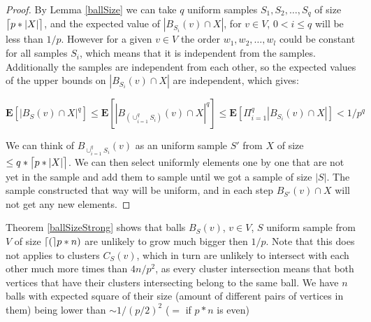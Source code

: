 \documentclass[shortabstract, lic, english]{iithesis}
\theoremstyle{definition} \newtheorem{definition}{Definition}[chapter]
\theoremstyle{remark} \newtheorem{remark}[definition]{Observation}
\theoremstyle{plain} \newtheorem{theorem}[definition]{Theorem}
\theoremstyle{plain} \newtheorem{lemma}[definition]{Lemma}
\theoremstyle{plain} \newtheorem{conjecture}[definition]{Conjecture}
\DeclarePairedDelimiter{\ceil}{\lceil}{\rceil}
\begin{document}
\begin{proof}
    By Lemma \ref{ballSize} we can take $q$ uniform samples $S_1, S_2, \ldots, S_q$ of size $\ceil[\big]{p * |X|}$,
    and the expected value of $|B_{S_i}(v) \cap X|$, for $v \in V$, $0 < i \leq q$ will be less than $1/p$.
    However for a given $v \in V$ the order $w_1, w_2, \ldots, w_l$ could be constant for all samples $S_i$,
    which means that it is independent from the samples. Additionally the samples are independent from each other,
    so the expected values of the upper bounds on $|B_{S_i}(v) \cap X|$ are independent, which gives:

    $$\mathbf{E}[|B_{S}(v) \cap X|^q] \leq \mathbf{E}[|B_{(\cup_{i = 1}^{q} S_i)}(v) \cap X|^q] \leq \mathbf{E}[\Pi_{i = 1}^{q} |B_{S_i}(v) \cap X|] < 1/p^q$$

    We can think of $B_{\cup_{i = 1}^{q} S_i}(v)$ as an uniform sample $S'$ from $X$ of size $\leq q*\ceil[\big]{p * |X|}$.
    We can then select uniformly elements one by one that are not yet in the sample and add them to sample until we got a sample of size $|S|$.
    The sample constructed that way will be uniform, and in each step $B_{S'}(v) \cap X$ will not get any new elements.
\end{proof}

Theorem \ref{ballSizeStrong} shows that balls $B_S(v)$, $v \in V$, $S$ uniform sample from $V$ of size $\ceil(p*n)$ are unlikely to grow much bigger then $1/p$.\newline
Note that this does not applies to clusters $C_S(v)$, which in turn are unlikely to intersect with each other much more times than $4n/p^2$,
as every cluster intersection means that both vertices that have their clusters intersecting belong to the same ball.
We have $n$ balls with expected square of their size (amount of different pairs of vertices in them) being lower than $\sim 1/(p/2)^2$ ($=$ if $p * n$ is even)
\end{document}
